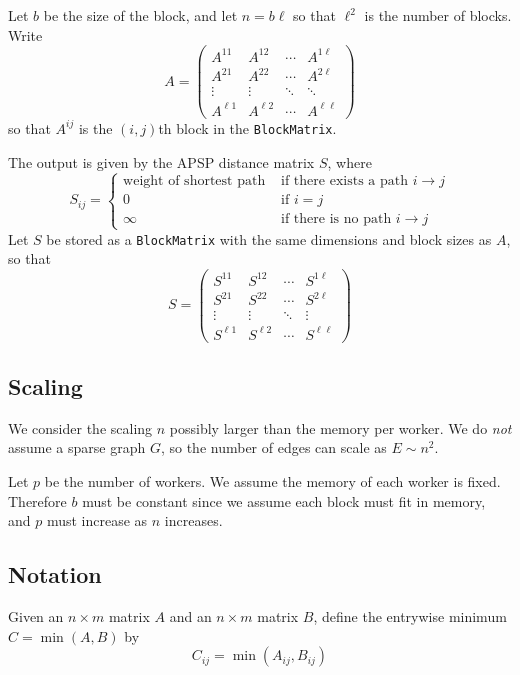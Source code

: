 \documentclass{article} %
\begin{document}
Let $b$ be the size of the block, and let $n = b\ell$ so that $\ell^2$
is the number of blocks.  Write
\[
A = \begin{pmatrix}
A^{11} & A^{12} & \cdots & A^{1\ell}\\
A^{21} & A^{22} & \cdots & A^{2\ell}\\
\vdots & \vdots & \ddots & \ddots\\
A^{\ell 1} & A^{\ell 2} & \cdots & A^{\ell \ell}
\end{pmatrix}
\]
so that $A^{ij}$ is the $(i,j)$th block in the {\tt BlockMatrix}.

The output is given by the APSP distance matrix $S$, where
\[
S_{ij} = 
\begin{cases}
\text{weight of shortest path} &\text{ if there exists a path } i \to j\\
0 &\text{ if } i = j\\
\infty &\text{ if there is no path } i \to j
\end{cases}
\]
Let $S$ be stored as a {\tt BlockMatrix} with the same dimensions and
block sizes as $A$, so that
\[
S = \begin{pmatrix}
S^{11} & S^{12} & \cdots & S^{1\ell}\\
S^{21} & S^{22} & \cdots & S^{2\ell}\\
\vdots & \vdots & \ddots & \vdots\\
S^{\ell 1} & S^{\ell 2} & \cdots & S^{\ell \ell}
\end{pmatrix}
\]

\subsection{Scaling}

We consider the scaling $n$ possibly larger than the memory per
worker.  We do \emph{not} assume a sparse graph $G$, so the number of
edges can scale as $E \sim n^2$.

Let $p$ be the number of workers.  We assume the memory of each worker
is fixed.  Therefore $b$ must be constant since we assume each block
must fit in memory, and $p$ must increase as $n$ increases.


\subsection{Notation}

Given an $n \times m$ matrix $A$ and an $n \times m$ matrix $B$, define the entrywise minimum $C = \min(A, B)$ by
\[
C_{ij} = \min(A_{ij}, B_{ij})
\]
\end{document}
